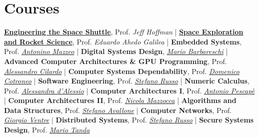 \documentclass[letterpaper]{twentysecondcv} %
\begin{document}
\section{Courses}

\href{https://www.edx.org/course/engineering-the-space-shuttle}{\textbf{Engineering the Space Shuttle}}, Prof. \textit{Jeff Hoffman} |
\href{https://www.edx.org/course/the-conquest-of-space-space-exploration-and-rocket}{\textbf{Space Exploration and Rocket Science}}, Prof. \textit{Eduardo Ahedo Galilea} |
\textbf{Embedded Systems}, Prof. \href{https://www.docenti.unina.it/antonino.mazzeo}{\textit{Antonino Mazzeo}} |
\textbf{Digital Systems Design}, \href{https://www.researchgate.net/profile/Mario_Barbareschi}{\textit{Mario Barbareschi}} |
\textbf{Advanced Computer Architectures \& GPU Programming}, Prof. \href{https://www.docenti.unina.it/alessandro.cilardo}{\textit{Alessandro Cilardo}} |
\textbf{Computer Systems Dependability}, Prof. \href{https://www.docenti.unina.it/domenico.cotroneo}{\textit{Domenico Cotroneo}} |
\textbf{Software Engineering}, Prof. \href{https://www.docenti.unina.it/stefano.russo}{\textit{Stefano Russo}} |
\textbf{Numeric Calculus}, Prof. \href{https://www.docenti.unina.it/alessandra.dalessio}{\textit{Alessandra d'Alessio}} |
\textbf{Computer Architectures I}, Prof. \href{https://www.docenti.unina.it/antonio.pescape}{\textit{Antonio Pescapè}} |
\textbf{Computer Architectures II}, Prof. \href{https://www.docenti.unina.it/nicola.mazzocca}{\textit{Nicola Mazzocca}} |
\textbf{Algorithms and Data Structures}, Prof. \href{https://www.docenti.unina.it/stefano.avallone}{\textit{Stefano Avallone}} |
\textbf{Computer Networks}, Prof. \href{https://www.docenti.unina.it/giorgio.ventre}{\textit{Giorgio Ventre}} |
\textbf{Distributed Systems}, Prof. \href{https://www.docenti.unina.it/stefano.russo}{\textit{Stefano Russo}} |
\textbf{Secure Systems Design}, Prof. \href{ttps://www.docenti.unina.it/mario.tanda}{\textit{Mario Tanda}}
\end{document}
